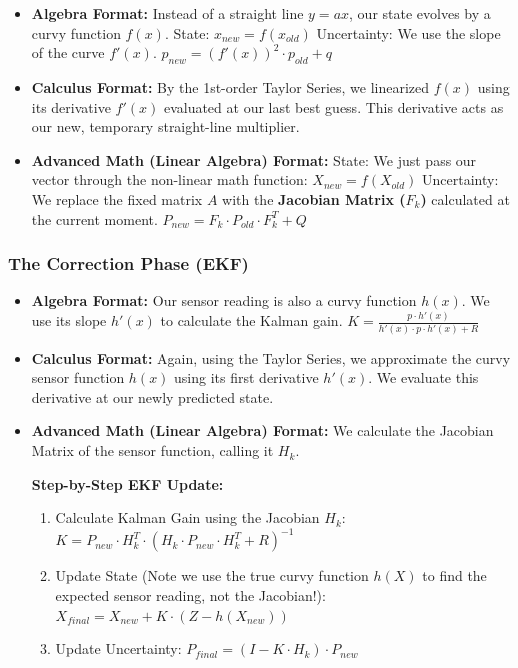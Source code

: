 \documentclass[
]{article}
\providecommand{\tightlist}{%
  \setlength{\itemsep}{0pt}\setlength{\parskip}{0pt}}
\begin{document}
\begin{itemize}
\item
  \textbf{Algebra Format:} Instead of a straight line \(y = ax\), our
  state evolves by a curvy function \(f(x)\). State:
  \(x_{new} = f(x_{old})\) Uncertainty: We use the slope of the curve
  \(f'(x)\). \(p_{new} = (f'(x))^2 \cdot p_{old} + q\)
\item
  \textbf{Calculus Format:} By the 1st-order Taylor Series, we
  linearized \(f(x)\) using its derivative \(f'(x)\) evaluated at our
  last best guess. This derivative acts as our new, temporary
  straight-line multiplier.
\item
  \textbf{Advanced Math (Linear Algebra) Format:} State: We just pass
  our vector through the non-linear math function:
  \(X_{new} = f(X_{old})\) Uncertainty: We replace the fixed matrix
  \(A\) with the \textbf{Jacobian Matrix (\(F_k\))} calculated at the
  current moment. \(P_{new} = F_k \cdot P_{old} \cdot F_k^T + Q\)
\end{itemize}

\subsubsection{The Correction Phase
(EKF)}\label{the-correction-phase-ekf}

\begin{itemize}
\item
  \textbf{Algebra Format:} Our sensor reading is also a curvy function
  \(h(x)\). We use its slope \(h'(x)\) to calculate the Kalman gain.
  \(K = \frac{p \cdot h'(x)}{h'(x) \cdot p \cdot h'(x) + R}\)
\item
  \textbf{Calculus Format:} Again, using the Taylor Series, we
  approximate the curvy sensor function \(h(x)\) using its first
  derivative \(h'(x)\). We evaluate this derivative at our newly
  predicted state.
\item
  \textbf{Advanced Math (Linear Algebra) Format:} We calculate the
  Jacobian Matrix of the sensor function, calling it \textbf{\(H_k\)}.

  \textbf{Step-by-Step EKF Update:}

  \begin{enumerate}
  \def\labelenumi{\arabic{enumi}.}
  \tightlist
  \item
    Calculate Kalman Gain using the Jacobian \(H_k\):
    \(K = P_{new} \cdot H_k^T \cdot (H_k \cdot P_{new} \cdot H_k^T + R)^{-1}\)
  \item
    Update State (Note we use the true curvy function \(h(X)\) to find
    the expected sensor reading, not the Jacobian!):
    \(X_{final} = X_{new} + K \cdot (Z - h(X_{new}))\)
  \item
    Update Uncertainty: \(P_{final} = (I - K \cdot H_k) \cdot P_{new}\)
  \end{enumerate}
\end{itemize}
\end{document}
